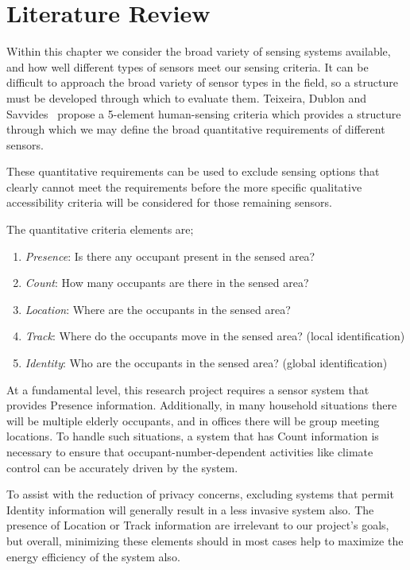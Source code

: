 \documentclass[../thesis/thesis.tex]{subfiles}
\begin{document}
\chapter{Literature Review}
\label{chap:litreview}

Within this chapter we consider the broad variety of sensing systems available, and how well different types of sensors meet our sensing criteria. It can be difficult to approach the broad variety of sensor types in the field, so a structure must be developed through which to evaluate them. Teixeira, Dublon and Savvides~\cite{teixeira2010survey} propose a 5-element human-sensing criteria which provides a structure through which we may define the broad quantitative requirements of different sensors.

These quantitative requirements can be used to exclude sensing options that clearly cannot meet the requirements before the more specific qualitative accessibility criteria will be considered for those remaining sensors. 

The quantitative criteria elements are;
\begin{enumerate}
 \item \emph{Presence}: Is there any occupant present in the sensed area?
 \item \emph{Count}: How many occupants are there in the sensed area?
 \item \emph{Location}: Where are the occupants in the sensed area?
 \item \emph{Track}: Where do the occupants move in the sensed area? (local identification)
 \item \emph{Identity}: Who are the occupants in the sensed area? (global identification)
\end{enumerate}

At a fundamental level, this research project requires a sensor system that provides Presence information. Additionally, in many household situations there will be multiple elderly occupants, and in offices there will be group meeting locations. To handle such situations, a system that has Count information is necessary to ensure that occupant-number-dependent activities like climate control can be accurately driven by the system.

To assist with the reduction of privacy concerns, excluding systems that permit Identity information will generally result in a less invasive system also. The presence of Location or Track information are irrelevant to our project's goals, but overall, minimizing these elements should in most cases help to maximize the energy efficiency of the system also.
\end{document}
